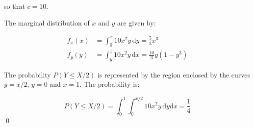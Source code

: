 \documentclass[12pt]{article}
\begin{document}
so that $c = 10$.

The marginal distribution of $x$ and $y$ are given by:


\begin{correction}
    \begin{equation}
        \begin{split}
            f_{x}(x) &= \int_{0}^{x} 10x^{2}y \, \mathrm{d}y = \frac{5}{3} x^{3} \\
            f_{y}(y) &= \int_{y}^{1} 10x^{2}y \, \mathrm{d}x = \frac{10}{3} y(1 - y^{3})
        \end{split}
    \end{equation}
\end{correction}

The probability $P(Y \le X/2)$ is represented by the region enclosed by the curves $y = x/2$, $y = 0$ and $x = 1$. The probability is:

\begin{equation}
    P(Y \le X/2) =  \int_{0}^{1} \int_{0}^{x/2} 10x^{2}y \, \mathrm{d}y \mathrm{d}x = \frac{1}{4}
\end{equation}
\qed
\end{document}
